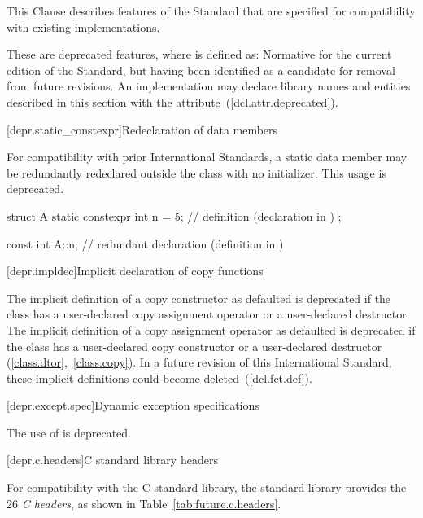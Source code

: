 
\pnum
This Clause describes features of the \Cpp Standard that are specified for compatibility with
existing implementations.

\pnum
These are deprecated features, where
is defined as:
Normative for the current edition of the Standard,
but having been identified as a candidate for removal from future revisions.
An implementation may declare library names and entities described in this section with the
 attribute~(\ref{dcl.attr.deprecated}).

[depr.static_constexpr]{Redeclaration of  data members}

\pnum
For compatibility with prior \Cpp{} International Standards, a 
static data member may be redundantly redeclared outside the class with no initializer.
This usage is deprecated.
\begin{example}
\begin{codeblock}
struct A {
  static constexpr int n = 5;  // definition (declaration in \CppXIV)
};

const int A::n;  // redundant declaration (definition in \CppXIV)
\end{codeblock}
\end{example}

[depr.impldec]{Implicit declaration of copy functions}

\pnum
The implicit definition of a copy constructor
as defaulted
is deprecated if the class has a
user-declared copy assignment operator or a user-declared destructor. The implicit
definition of a copy assignment operator
as defaulted is deprecated if the class has a user-declared
copy constructor or a user-declared destructor (\ref{class.dtor},~\ref{class.copy}).
In a future revision of this International Standard, these implicit definitions
could become deleted~(\ref{dcl.fct.def}).

[depr.except.spec]{Dynamic exception specifications}

\pnum
The use of  is deprecated.

[depr.c.headers]{C standard library headers}

\pnum
For compatibility with the 
%
C standard library, the \Cpp standard library provides
the 26 \textit{C headers}, as shown in Table~\ref{tab:future.c.headers}.

